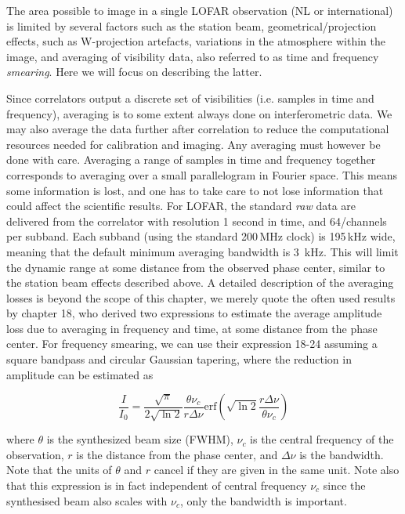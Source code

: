 \documentclass[graybox]{svmult}
\begin{document}
The area possible to image in a single LOFAR observation (NL or international)
is limited by several factors such as the station beam, geometrical/projection
effects, such as W-projection artefacts, variations in the atmosphere within
the image, and averaging of visibility data, also referred to as time and
frequency \emph{smearing}. Here we will focus on describing the latter.

Since correlators output a discrete set of visibilities (i.e. samples in time
and frequency), averaging is to some extent always done on interferometric
data. We may also average the data further after correlation to reduce the
computational resources needed for calibration and imaging. Any averaging must
however be done with care.  Averaging a range of samples in time and frequency
together corresponds to averaging over a small parallelogram in Fourier space.
This means some information is lost, and one has to take care to not lose
information that could affect the scientific results. For LOFAR, the standard
\emph{raw} data are delivered from the correlator with resolution 1 second in
time, and 64/channels per subband.  Each subband (using the standard 200\,MHz
clock) is 195\,kHz wide, meaning that the default minimum averaging bandwidth is
3~kHz. This will limit the dynamic range at some distance from the observed
phase center, similar to the station beam effects described above.  A detailed
description of the averaging losses is beyond the scope of this chapter, we
merely quote the often used results by \cite{taylor99} 
chapter 18, who derived two expressions to estimate the average amplitude loss
due to averaging in frequency and time, at some distance from the phase center.
For frequency smearing, we can use their expression 18-24 assuming a square
bandpass and circular Gaussian tapering, where the reduction in amplitude can
be estimated as

\begin{equation}
\frac{I}{I_0} = \frac{\sqrt{\pi}}{2\sqrt{\ln{2}}}\frac{\theta \nu_c}{r \Delta
\nu}\mathrm{erf}\left(\sqrt{\ln{2}}\frac{r \Delta\nu}{\theta \nu_c}\right)
\label{eqn:freqloss}
\end{equation}

where $\theta$ is the synthesized beam size (FWHM), $\nu_c$ is the central
frequency of the observation, $r$ is the distance from the phase center, and
$\Delta \nu$ is the bandwidth. Note that the units of $\theta$ and $r$ cancel
if they are given in the same unit. Note also that this expression is in fact
independent of central frequency $\nu_c$ since the synthesised beam also scales
with $\nu_c$, only the bandwidth is important.
\end{document}
